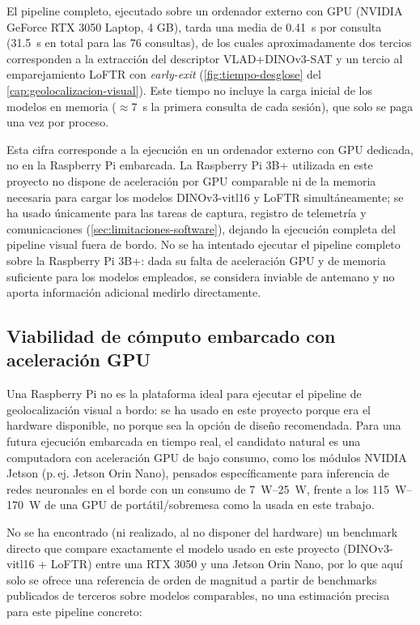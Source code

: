 El pipeline completo, ejecutado sobre un ordenador externo con GPU (NVIDIA GeForce RTX 3050 Laptop, 4 GB), tarda una media de \SI{0.41}{\second} por consulta (\SI{31.5}{\second} en total para las 76 consultas), de los cuales aproximadamente dos tercios corresponden a la extracción del descriptor VLAD+DINOv3-SAT y un tercio al emparejamiento LoFTR con \textit{early-exit} (\autoref{fig:tiempo-desglose} del \autoref{cap:geolocalizacion-visual}). Este tiempo no incluye la carga inicial de los modelos en memoria ($\approx$\SI{7}{\second} la primera consulta de cada sesión), que solo se paga una vez por proceso.

Esta cifra corresponde a la ejecución en un ordenador externo con GPU dedicada, no en la Raspberry Pi embarcada. La Raspberry Pi 3B+ utilizada en este proyecto no dispone de aceleración por GPU comparable ni de la memoria necesaria para cargar los modelos DINOv3-vitl16 y LoFTR simultáneamente; se ha usado únicamente para las tareas de captura, registro de telemetría y comunicaciones (\autoref{sec:limitaciones-software}), dejando la ejecución completa del pipeline visual fuera de bordo. No se ha intentado ejecutar el pipeline completo sobre la Raspberry Pi 3B+: dada su falta de aceleración GPU y de memoria suficiente para los modelos empleados, se considera inviable de antemano y no aporta información adicional medirlo directamente.

\subsection{Viabilidad de cómputo embarcado con aceleración GPU}
\label{sec:viabilidad-jetson}

Una Raspberry Pi no es la plataforma ideal para ejecutar el pipeline de geolocalización visual a bordo: se ha usado en este proyecto porque era el hardware disponible, no porque sea la opción de diseño recomendada. Para una futura ejecución embarcada en tiempo real, el candidato natural es una computadora con aceleración GPU de bajo consumo, como los módulos NVIDIA Jetson (p.\,ej. Jetson Orin Nano), pensados específicamente para inferencia de redes neuronales en el borde con un consumo de \SIrange{7}{25}{\watt}, frente a los \SIrange{115}{170}{\watt} de una GPU de portátil/sobremesa como la usada en este trabajo.

No se ha encontrado (ni realizado, al no disponer del hardware) un benchmark directo que compare exactamente el modelo usado en este proyecto (DINOv3-vitl16 + LoFTR) entre una RTX 3050 y una Jetson Orin Nano, por lo que aquí solo se ofrece una referencia de orden de magnitud a partir de benchmarks publicados de terceros sobre modelos comparables, no una estimación precisa para este pipeline concreto:

